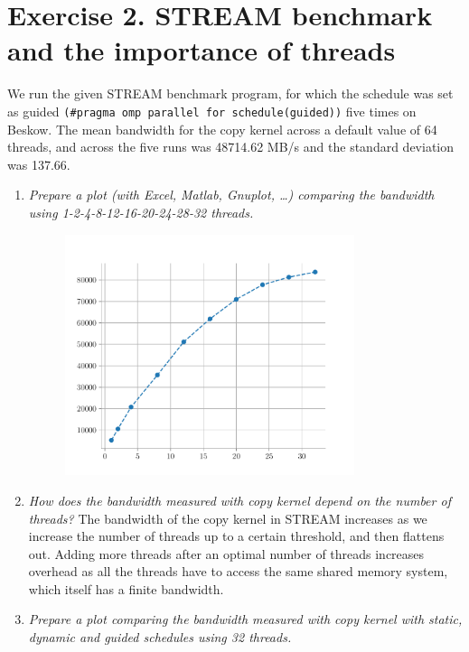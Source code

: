\documentclass[12pt]{article}
\begin{document}
\section{Exercise 2. STREAM benchmark and the importance of threads}
We run the given STREAM benchmark program, for which the schedule was set as guided \texttt{(\#pragma omp parallel for schedule(guided))} five times on Beskow. The mean bandwidth for the copy kernel across a default value of 64 threads, and across the five runs was 48714.62 MB/s and the standard deviation was 137.66.
	\begin{enumerate}
		\item \textit{Prepare a plot (with Excel, Matlab, Gnuplot, …) comparing the bandwidth using 1-2-4-8-12-16-20-24-28-32 threads.}
		
		\begin{figure}[H]
			\centering
			\includegraphics[width=0.8\textwidth]{stream.pdf}
		\end{figure}
		\item \textit{How does the bandwidth measured with copy kernel depend on the number of threads?}
		The bandwidth of the copy kernel in STREAM increases as we increase the number of threads up to a certain threshold, and then flattens out. Adding more threads after an optimal number of threads increases overhead as all the threads have to access the same shared memory system, which itself has a finite bandwidth.
		\item \textit{Prepare a plot comparing the bandwidth measured with copy kernel with static, dynamic and guided schedules using 32 threads.}
		\begin{figure}[H]
			\centering

\end{figure}
\end{enumerate}
\end{document}
